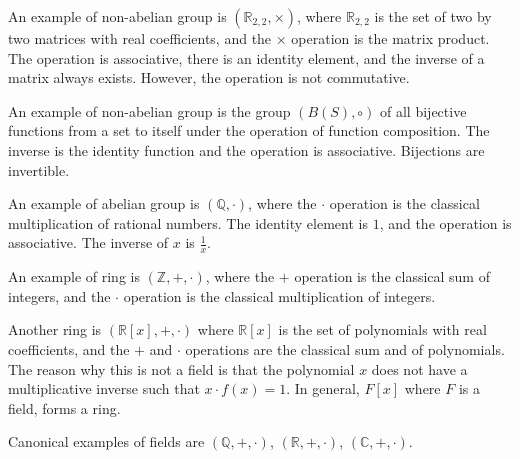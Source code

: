 \begin{example}
    An example of non-abelian group is $(\mathbb{R}_{2,2}, \times)$, where $\mathbb{R}_{2,2}$ 
    is the set of two by two matrices with real coefficients, and the $\times$ operation is the 
    matrix product. The operation is associative, there is an identity element, and the
    inverse of a matrix always exists. However, the operation is not commutative. \\ 
\end{example}

\begin{example}
    An example of non-abelian group is the group $(B(S), \circ)$ of all bijective functions from 
    a set to itself under the operation of function composition. The inverse is the identity 
    function and the operation is associative. Bijections are invertible. \\ 
\end{example}

\begin{example}
    An example of abelian group is $(\mathbb{Q}, \cdot)$, where the $\cdot$ operation is the 
    classical multiplication of rational numbers. The identity element is $1$, and the 
    operation is associative. The inverse of $x$ is $\frac{1}{x}$. \\
\end{example}

\begin{example}
    An example of ring is $(\mathbb{Z}, +, \cdot)$, where the $+$ operation is the classical sum of
    integers, and the $\cdot$ operation is the classical multiplication of integers. \\
\end{example}

\begin{example}
    Another ring is $(\mathbb{R}[x], +, \cdot)$ where $\mathbb{R}[x]$ is the set of
    polynomials with real coefficients, and the $+$ and $\cdot$ operations are the classical sum and
    of polynomials. The reason why this is not a field is that the polynomial $x$ does not have a
    multiplicative inverse such that $x \cdot f(x) = 1$. In general, $F[x]$ where $F$ is a field, 
    forms a ring. \\
\end{example}

\begin{example}
    Canonical examples of fields are $(\mathbb{Q}, +, \cdot)$, $(\mathbb{R}, +, \cdot)$, 
    $(\mathbb{C}, +, \cdot)$. \\
\end{example}

\newpage
